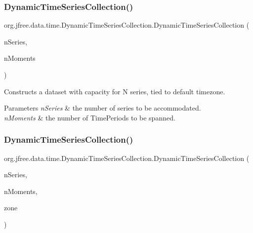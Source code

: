 \subsubsection{\texorpdfstring{Dynamic\+Time\+Series\+Collection()}{DynamicTimeSeriesCollection()}\hspace{0.1cm}{\footnotesize\ttfamily [1/4]}}
{\footnotesize\ttfamily org.\+jfree.\+data.\+time.\+Dynamic\+Time\+Series\+Collection.\+Dynamic\+Time\+Series\+Collection (\begin{DoxyParamCaption}\item[{int}]{n\+Series,  }\item[{int}]{n\+Moments }\end{DoxyParamCaption})}

Constructs a dataset with capacity for N series, tied to default timezone.


\begin{DoxyParams}{Parameters}
{\em n\+Series} & the number of series to be accommodated. \\
\hline
{\em n\+Moments} & the number of Time\+Periods to be spanned. \\
\hline
\end{DoxyParams}
\mbox{\label{classorg_1_1jfree_1_1data_1_1time_1_1_dynamic_time_series_collection_a34781988574ade62ae8ce2bf97538db6}} 
\subsubsection{\texorpdfstring{Dynamic\+Time\+Series\+Collection()}{DynamicTimeSeriesCollection()}\hspace{0.1cm}{\footnotesize\ttfamily [2/4]}}
{\footnotesize\ttfamily org.\+jfree.\+data.\+time.\+Dynamic\+Time\+Series\+Collection.\+Dynamic\+Time\+Series\+Collection (\begin{DoxyParamCaption}\item[{int}]{n\+Series,  }\item[{int}]{n\+Moments,  }\item[{Time\+Zone}]{zone }\end{DoxyParamCaption})}

